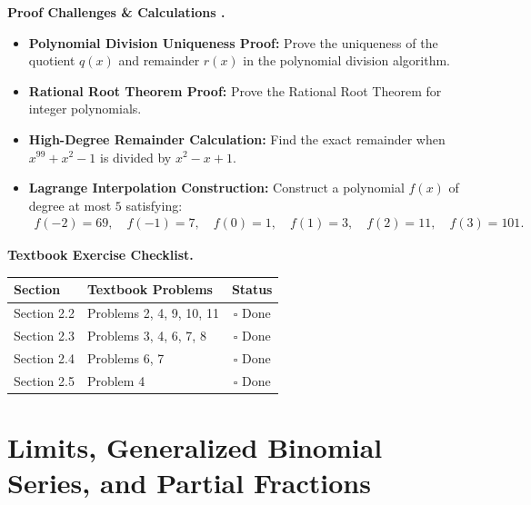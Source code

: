 \documentclass{natsirt}
\newcounter{topic}[section]
\newenvironment{challengebox}[1][]{%
    \begin{redbox}[#1]\refstepcounter{topic}\textbf{Proof Challenges \& Calculations \thesection.\thetopic}%
}{\end{redbox}}
\newenvironment{reviewbox}[1][]{\begin{whitebox}[#1]\textbf{Textbook Exercise Checklist. }}{\end{whitebox}}
\newcommand{\citem}{\item[$\square$]}
\begin{document}
\begin{challengebox}
    \begin{itemize}
        \citem \textbf{Polynomial Division Uniqueness Proof:} Prove the uniqueness of the quotient $q(x)$ and remainder $r(x)$ in the polynomial division algorithm.
        \citem \textbf{Rational Root Theorem Proof:} Prove the Rational Root Theorem for integer polynomials.
        \citem \textbf{High-Degree Remainder Calculation:} Find the exact remainder when $x^{99} + x^2 - 1$ is divided by $x^2 - x + 1$.
        \citem \textbf{Lagrange Interpolation Construction:} Construct a polynomial $f(x)$ of degree at most $5$ satisfying:
        \begin{align*}
            f(-2) = 69, \quad f(-1) = 7, \quad f(0) = 1, \quad f(1) = 3, \quad f(2) = 11, \quad f(3) = 101.
        \end{align*}
    \end{itemize}
\end{challengebox}

\begin{reviewbox}
    \begin{center}
    \begin{tabular}{|l|l|c|}
        \hline
        \textbf{Section} & \textbf{Textbook Problems} & \textbf{Status} \\
        \hline
        Section 2.2 & Problems 2, 4, 9, 10, 11 & $\square$ Done \\
        Section 2.3 & Problems 3, 4, 6, 7, 8 & $\square$ Done \\
        Section 2.4 & Problems 6, 7 & $\square$ Done \\
        Section 2.5 & Problem 4 & $\square$ Done \\
        \hline
    \end{tabular}
    \end{center}
\end{reviewbox}


\section{Limits, Generalized Binomial Series, and Partial Fractions}
\end{document}
